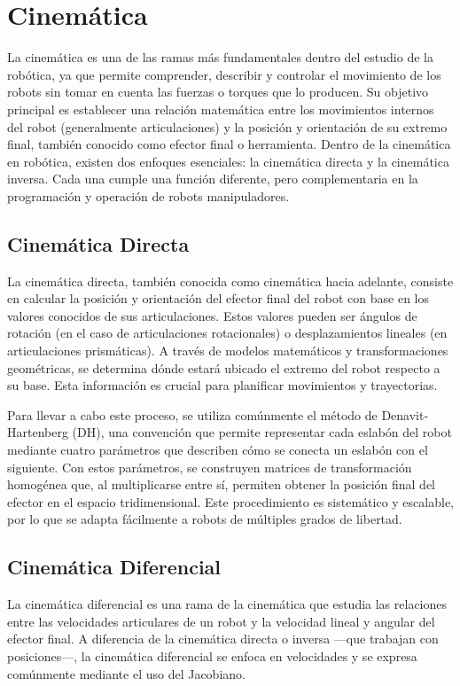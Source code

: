 \section{Cinemática} \label{sec:cinematica}

La cinemática es una de las ramas más fundamentales dentro del estudio de la robótica, ya que permite comprender, describir y controlar el movimiento de los robots sin tomar en cuenta las fuerzas o torques que lo producen. Su objetivo principal es establecer una relación matemática entre los movimientos internos del robot (generalmente articulaciones) y la posición y orientación de su extremo final, también conocido como efector final o herramienta.
Dentro de la cinemática en robótica, existen dos enfoques esenciales: la cinemática directa y la cinemática inversa. Cada una cumple una función diferente, pero complementaria en la programación y operación de robots manipuladores.

\subsection{Cinemática Directa}
La cinemática directa, también conocida como cinemática hacia adelante, consiste en calcular la posición y orientación del efector final del robot con base en los valores conocidos de sus articulaciones. Estos valores pueden ser ángulos de rotación (en el caso de articulaciones rotacionales) o desplazamientos lineales (en articulaciones prismáticas). A través de modelos matemáticos y transformaciones geométricas, se determina dónde estará ubicado el extremo del robot respecto a su base. Esta información es crucial para planificar movimientos y trayectorias.


Para llevar a cabo este proceso, se utiliza comúnmente el método de Denavit-Hartenberg (DH), una convención que permite representar cada eslabón del robot mediante cuatro parámetros que describen cómo se conecta un eslabón con el siguiente. Con estos parámetros, se construyen matrices de transformación homogénea que, al multiplicarse entre sí, permiten obtener la posición final del efector en el espacio tridimensional. Este procedimiento es sistemático y escalable, por lo que se adapta fácilmente a robots de múltiples grados de libertad.

\subsection{Cinemática Diferencial}
La cinemática diferencial es una rama de la cinemática que estudia las relaciones entre las velocidades articulares de un robot y la velocidad lineal y angular del efector final. A diferencia de la cinemática directa o inversa —que trabajan con posiciones—, la cinemática diferencial se enfoca en velocidades y se expresa comúnmente mediante el uso del Jacobiano.

